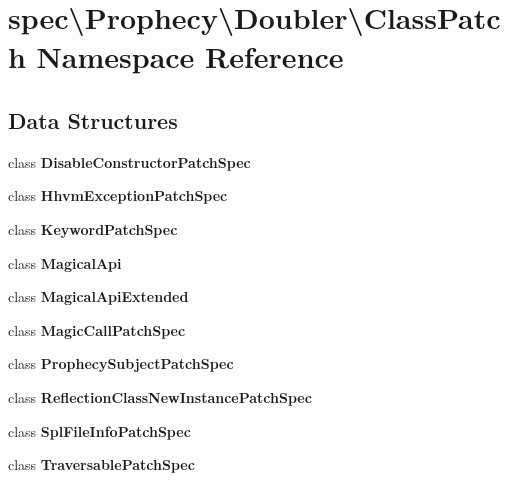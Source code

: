 \section{spec\textbackslash{}Prophecy\textbackslash{}Doubler\textbackslash{}Class\+Patch Namespace Reference}
\label{namespacespec_1_1_prophecy_1_1_doubler_1_1_class_patch}
\subsection*{Data Structures}
\begin{DoxyCompactItemize}
\item 
class {\bf Disable\+Constructor\+Patch\+Spec}
\item 
class {\bf Hhvm\+Exception\+Patch\+Spec}
\item 
class {\bf Keyword\+Patch\+Spec}
\item 
class {\bf Magical\+Api}
\item 
class {\bf Magical\+Api\+Extended}
\item 
class {\bf Magic\+Call\+Patch\+Spec}
\item 
class {\bf Prophecy\+Subject\+Patch\+Spec}
\item 
class {\bf Reflection\+Class\+New\+Instance\+Patch\+Spec}
\item 
class {\bf Spl\+File\+Info\+Patch\+Spec}
\item 
class {\bf Traversable\+Patch\+Spec}
\end{DoxyCompactItemize}
